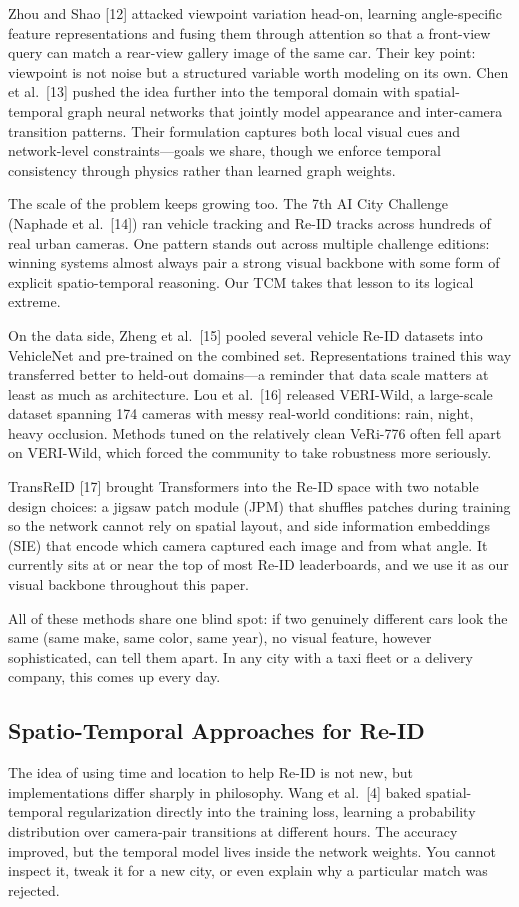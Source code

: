 \documentclass{ijitcs}
\begin{document}
Zhou and Shao [12] attacked viewpoint variation head-on, learning angle-specific feature representations and fusing them through attention so that a front-view query can match a rear-view gallery image of the same car. Their key point: viewpoint is not noise but a structured variable worth modeling on its own. Chen et al.\ [13] pushed the idea further into the temporal domain with spatial-temporal graph neural networks that jointly model appearance and inter-camera transition patterns. Their formulation captures both local visual cues and network-level constraints---goals we share, though we enforce temporal consistency through physics rather than learned graph weights.

The scale of the problem keeps growing too. The 7th AI City Challenge (Naphade et al.\ [14]) ran vehicle tracking and Re-ID tracks across hundreds of real urban cameras. One pattern stands out across multiple challenge editions: winning systems almost always pair a strong visual backbone with some form of explicit spatio-temporal reasoning. Our TCM takes that lesson to its logical extreme.

On the data side, Zheng et al.\ [15] pooled several vehicle Re-ID datasets into VehicleNet and pre-trained on the combined set. Representations trained this way transferred better to held-out domains---a reminder that data scale matters at least as much as architecture. Lou et al.\ [16] released VERI-Wild, a large-scale dataset spanning 174 cameras with messy real-world conditions: rain, night, heavy occlusion. Methods tuned on the relatively clean VeRi-776 often fell apart on VERI-Wild, which forced the community to take robustness more seriously.

TransReID [17] brought Transformers into the Re-ID space with two notable design choices: a jigsaw patch module (JPM) that shuffles patches during training so the network cannot rely on spatial layout, and side information embeddings (SIE) that encode which camera captured each image and from what angle. It currently sits at or near the top of most Re-ID leaderboards, and we use it as our visual backbone throughout this paper.

All of these methods share one blind spot: if two genuinely different cars look the same (same make, same color, same year), no visual feature, however sophisticated, can tell them apart. In any city with a taxi fleet or a delivery company, this comes up every day.

\subsection{Spatio-Temporal Approaches for Re-ID}
The idea of using time and location to help Re-ID is not new, but implementations differ sharply in philosophy. Wang et al.\ [4] baked spatial-temporal regularization directly into the training loss, learning a probability distribution over camera-pair transitions at different hours. The accuracy improved, but the temporal model lives inside the network weights. You cannot inspect it, tweak it for a new city, or even explain why a particular match was rejected.
\end{document}
